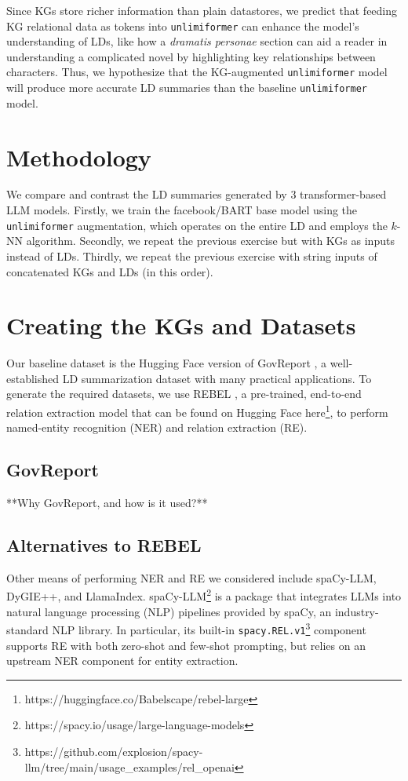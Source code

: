 \documentclass[12pt]{article}
\begin{document}
Since KGs store richer information than plain datastores, we predict that feeding KG relational data as tokens into \texttt{unlimiformer} can enhance the model's understanding of LDs, like how a \textit{dramatis personae} section can aid a reader in understanding a complicated novel by highlighting key relationships between characters. Thus, we hypothesize that the KG-augmented \texttt{unlimiformer} model will produce more accurate LD summaries than the baseline \texttt{unlimiformer} model.

\section{Methodology}
We compare and contrast the LD summaries generated by 3 transformer-based LLM models. Firstly, we train the facebook/BART base model using the \texttt{unlimiformer} augmentation, which operates on the entire LD and employs the $k$-NN algorithm. Secondly, we repeat the previous exercise but with KGs as inputs instead of LDs. Thirdly, we repeat the previous exercise with string inputs of concatenated KGs and LDs (in this order).

\section{Creating the KGs and Datasets}
Our baseline dataset is the Hugging Face version of GovReport \cite{huang2021efficient}, a well-established LD summarization dataset with many practical applications. To generate the required datasets, we use REBEL \cite{huguet2021rebel}, a pre-trained, end-to-end relation extraction model that can be found on Hugging Face here\footnote{https://huggingface.co/Babelscape/rebel-large}, to perform named-entity recognition (NER) and relation extraction (RE).

\subsection*{GovReport}
**Why GovReport, and how is it used?**


\subsection*{Alternatives to REBEL}
Other means of performing NER and RE we considered include spaCy-LLM, DyGIE++, and LlamaIndex. spaCy-LLM\footnote{https://spacy.io/usage/large-language-models} is a package that integrates LLMs into natural language processing (NLP) pipelines provided by spaCy, an industry-standard NLP library. In particular, its built-in \texttt{spacy.REL.v1}\footnote{https://github.com/explosion/spacy-llm/tree/main/usage\_examples/rel\_openai} component supports RE with both zero-shot and few-shot prompting, but relies on an upstream NER component for entity extraction. 
\end{document}

